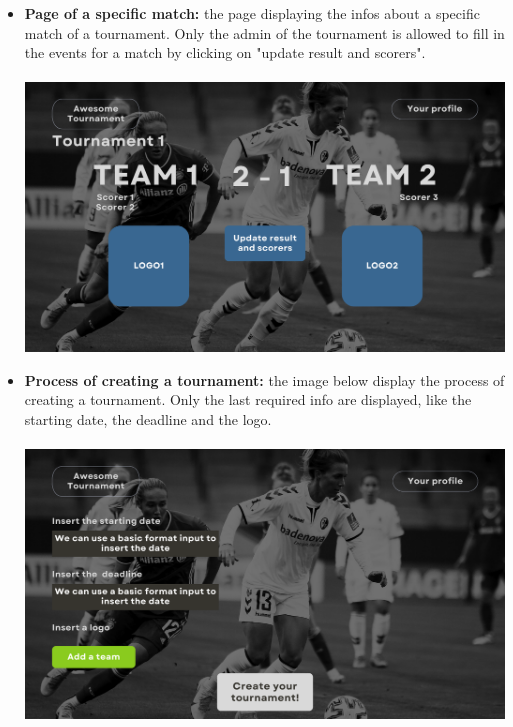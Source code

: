 \begin{itemize}
    \item \textbf{Page of a specific match:} the page displaying the infos about a specific match of a tournament. Only the admin of the tournament is allowed to fill in the events for a match by clicking on "update result and scorers".\\\\
    \includegraphics[scale = 0.4]{sections/match.png}

    \item \textbf{Process of creating a tournament:} the image below display the process of creating a tournament. Only the last required info are displayed, like the starting date, the deadline and the logo.\\\\
    \includegraphics[scale = 0.4]{sections/createtour.png}
\end{itemize}